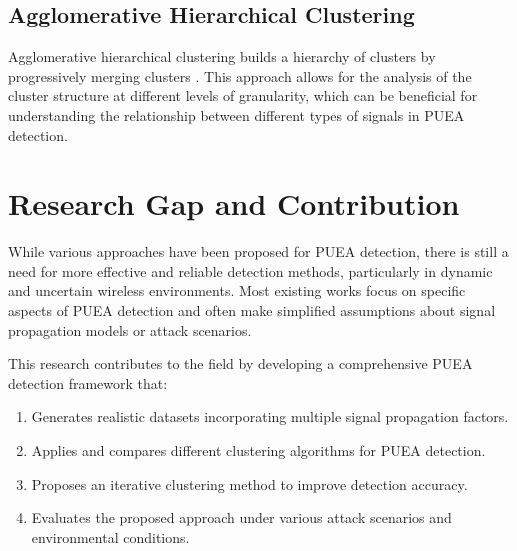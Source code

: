 \subsection{Agglomerative Hierarchical Clustering}
Agglomerative hierarchical clustering builds a hierarchy of clusters by progressively merging clusters \cite{murtagh2012algorithms}. This approach allows for the analysis of the cluster structure at different levels of granularity, which can be beneficial for understanding the relationship between different types of signals in PUEA detection.

\section{Research Gap and Contribution}
While various approaches have been proposed for PUEA detection, there is still a need for more effective and reliable detection methods, particularly in dynamic and uncertain wireless environments. Most existing works focus on specific aspects of PUEA detection and often make simplified assumptions about signal propagation models or attack scenarios.

This research contributes to the field by developing a comprehensive PUEA detection framework that:
\begin{enumerate}
    \item Generates realistic datasets incorporating multiple signal propagation factors.
    \item Applies and compares different clustering algorithms for PUEA detection.
    \item Proposes an iterative clustering method to improve detection accuracy.
    \item Evaluates the proposed approach under various attack scenarios and environmental conditions.
\end{enumerate}

